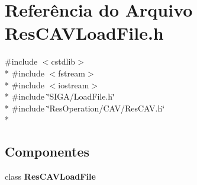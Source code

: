 \section{Referência do Arquivo Res\+C\+A\+V\+Load\+File.\+h}
\label{_c_a_v_2_res_c_a_v_load_file_8h}
{\ttfamily \#include $<$cstdlib$>$}\\*
{\ttfamily \#include $<$fstream$>$}\\*
{\ttfamily \#include $<$iostream$>$}\\*
{\ttfamily \#include \char`\"{}S\+I\+G\+A/\+Load\+File.\+h\char`\"{}}\\*
{\ttfamily \#include \char`\"{}Res\+Operation/\+C\+A\+V/\+Res\+C\+A\+V.\+h\char`\"{}}\\*
\subsection*{Componentes}
\begin{DoxyCompactItemize}
\item 
class {\bf Res\+C\+A\+V\+Load\+File}
\end{DoxyCompactItemize}
